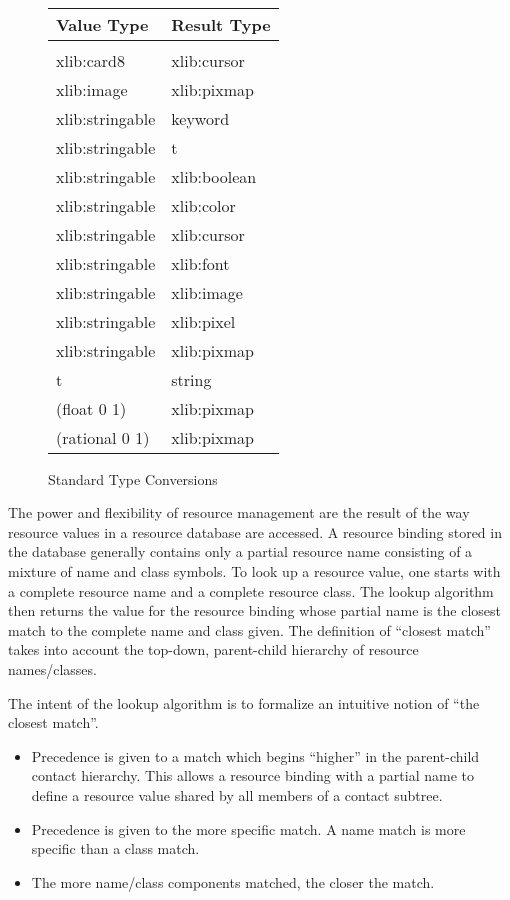 \begin{figure}[h]
\caption{Standard Type Conversions}
\label{fig:conversions}
\begin{center}
\tt
\begin{tabular}{|ll|} \hline
{\rm Value Type} & {\rm Result Type}\\ \hline
& \\ 
xlib:card8 & xlib:cursor\\ 
xlib:image      & xlib:pixmap \\
xlib:stringable & keyword\\ 
xlib:stringable & t\\ 
xlib:stringable & xlib:boolean \\ 
xlib:stringable & xlib:color\\ 
xlib:stringable & xlib:cursor\\ 
xlib:stringable & xlib:font \\ 
xlib:stringable & xlib:image \\ 
xlib:stringable & xlib:pixel\\ 
xlib:stringable & xlib:pixmap\\ 
t               & string \\
(float 0 1)     & xlib:pixmap \\
(rational 0 1)  & xlib:pixmap \\
\hline
\end{tabular}
\rm
\end{center}
\end{figure}


The power and flexibility of resource management are the result of the way
resource values in a resource database are accessed. A resource binding
stored in
the database generally contains only a partial resource name consisting of a
mixture of name and class symbols. To look up a
resource value, one starts with a complete resource name and a
complete resource class. The lookup algorithm then returns the value
for the resource binding whose partial name is the closest match to the complete
name and class given. The definition of ``closest match'' takes into account
the
top-down, parent-child hierarchy of resource names/classes.



The intent of the lookup  algorithm is to formalize an
intuitive notion of ``the closest match''.  
\begin{itemize} 
\item Precedence is given to a  match which begins ``higher'' in the
parent-child contact hierarchy. This allows a resource binding with a partial
name to define a resource value shared by all members of a contact subtree.

\item Precedence is given to the more specific match. A name match is more
specific than a class match. 

\item The more name/class components matched, the closer the match.
\end{itemize}

